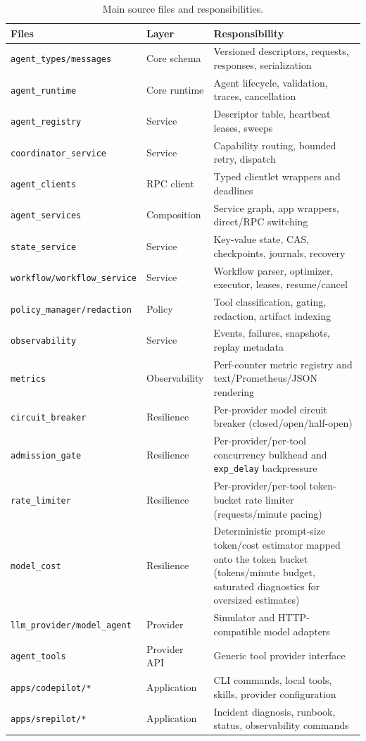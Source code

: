 \documentclass[manuscript,screen,review]{acmart}
\begin{document}
\begin{table}[t]
\caption{Main source files and responsibilities.}
\label{tab:file-responsibilities}
\centering
\begin{tabular}{lll}
\toprule
Files & Layer & Responsibility \\
\midrule
\texttt{agent\_types/messages} & Core schema & Versioned descriptors, requests, responses, serialization \\
\texttt{agent\_runtime} & Core runtime & Agent lifecycle, validation, traces, cancellation \\
\texttt{agent\_registry} & Service & Descriptor table, heartbeat leases, sweeps \\
\texttt{coordinator\_service} & Service & Capability routing, bounded retry, dispatch \\
\texttt{agent\_clients} & RPC client & Typed clientlet wrappers and deadlines \\
\texttt{agent\_services} & Composition & Service graph, app wrappers, direct/RPC switching \\
\texttt{state\_service} & Service & Key-value state, CAS, checkpoints, journals, recovery \\
\texttt{workflow/workflow\_service} & Service & Workflow parser, optimizer, executor, leases, resume/cancel \\
\texttt{policy\_manager/redaction} & Policy & Tool classification, gating, redaction, artifact indexing \\
\texttt{observability} & Service & Events, failures, snapshots, replay metadata \\
\texttt{metrics} & Observability & Perf-counter metric registry and text/Prometheus/JSON rendering \\
\texttt{circuit\_breaker} & Resilience & Per-provider model circuit breaker (closed/open/half-open) \\
\texttt{admission\_gate} & Resilience & Per-provider/per-tool concurrency bulkhead and \texttt{exp\_delay} backpressure \\
\texttt{rate\_limiter} & Resilience & Per-provider/per-tool token-bucket rate limiter (requests/minute pacing) \\
\texttt{model\_cost} & Resilience & Deterministic prompt-size token/cost estimator mapped onto the token bucket (tokens/minute budget, saturated diagnostics for oversized estimates) \\
\texttt{llm\_provider/model\_agent} & Provider & Simulator and HTTP-compatible model adapters \\
\texttt{agent\_tools} & Provider API & Generic tool provider interface \\
\texttt{apps/codepilot/*} & Application & CLI commands, local tools, skills, provider configuration \\
\texttt{apps/srepilot/*} & Application & Incident diagnosis, runbook, status, observability commands \\
\bottomrule
\end{tabular}
\end{table}
\end{document}

